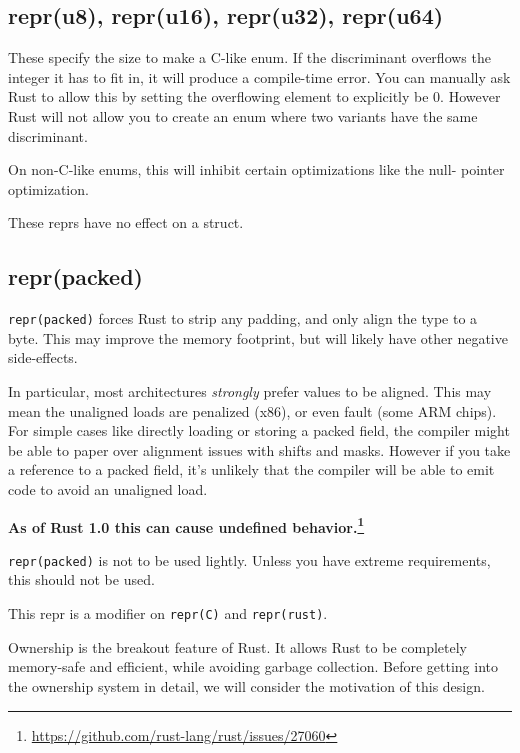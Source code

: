 \documentclass[a4paper,]{book}
\renewcommand{\href}[2]{#2\footnote{\url{#1}}}
\begin{document}
\subsection{repr(u8), repr(u16), repr(u32),
repr(u64)}\label{repru8-repru16-repru32-repru64}

These specify the size to make a C-like enum. If the discriminant
overflows the integer it has to fit in, it will produce a compile-time
error. You can manually ask Rust to allow this by setting the
overflowing element to explicitly be 0. However Rust will not allow you
to create an enum where two variants have the same discriminant.

On non-C-like enums, this will inhibit certain optimizations like the
null- pointer optimization.

These reprs have no effect on a struct.

\subsection{repr(packed)}\label{reprpacked}

\texttt{repr(packed)} forces Rust to strip any padding, and only align
the type to a byte. This may improve the memory footprint, but will
likely have other negative side-effects.

In particular, most architectures \emph{strongly} prefer values to be
aligned. This may mean the unaligned loads are penalized (x86), or even
fault (some ARM chips). For simple cases like directly loading or
storing a packed field, the compiler might be able to paper over
alignment issues with shifts and masks. However if you take a reference
to a packed field, it's unlikely that the compiler will be able to emit
code to avoid an unaligned load.

\textbf{\href{https://github.com/rust-lang/rust/issues/27060}{As of Rust
1.0 this can cause undefined behavior.}}

\texttt{repr(packed)} is not to be used lightly. Unless you have extreme
requirements, this should not be used.

This repr is a modifier on \texttt{repr(C)} and \texttt{repr(rust)}.


Ownership is the breakout feature of Rust. It allows Rust to be
completely memory-safe and efficient, while avoiding garbage collection.
Before getting into the ownership system in detail, we will consider the
motivation of this design.
\end{document}
